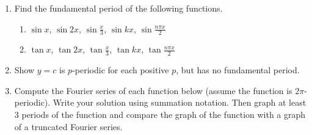 \begin{enumerate}
	\item Find the fundamental period of the following functions.
	
\begin{enumerate}
	\item $\sin x$, $\sin 2x$, $\sin \frac{x}{3}$, $\sin kx$, $\sin \frac{n\pi x}{2}$
	\item $\tan x$, $\tan 2x$, $\tan \frac{x}{3}$, $\tan kx$, $\tan \frac{n\pi x}{2}$
\end{enumerate}
	\item Show $y=c$ is $p$-periodic for each positive $p$, but has no fundamental period.

	\item Compute the Fourier series of each function below (assume the function is $2\pi$-periodic). Write your solution using summation notation. Then graph at least 3 periods of the function and compare the graph of the function with a graph of a truncated Fourier series.
	\begin{multicols}{2}
\end{multicols}
\end{enumerate}
